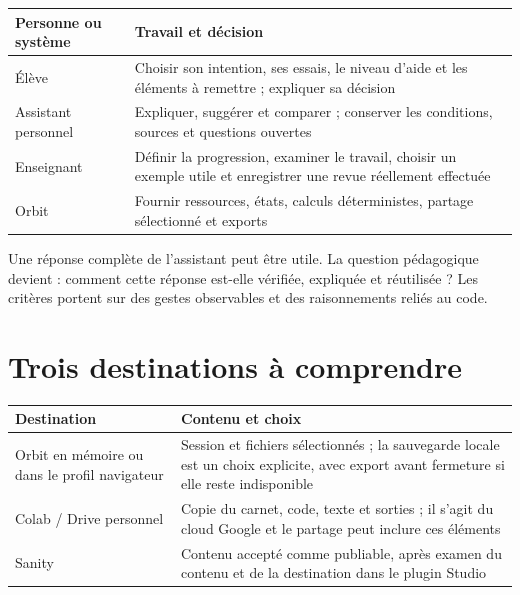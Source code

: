 \documentclass[
  canadien,
  11pt,
  a4paper,
]{report}
\newcounter{none} %
\begin{document}
{\def\LTcaptype{none} %
\begin{longtable}[]{@{}
  >{\raggedright\arraybackslash}p{}
  >{\raggedright\arraybackslash}p{}@{}}
\toprule\noalign{}
\begin{minipage}[b]{\linewidth}\raggedright
Personne ou système
\end{minipage} & \begin{minipage}[b]{\linewidth}\raggedright
Travail et décision
\end{minipage} \\
\midrule\noalign{}
\endhead
\bottomrule\noalign{}
\endlastfoot
Élève & Choisir son intention, ses essais, le niveau d'aide et les
éléments à remettre ; expliquer sa décision \\
Assistant personnel & Expliquer, suggérer et comparer ; conserver les
conditions, sources et questions ouvertes \\
Enseignant & Définir la progression, examiner le travail, choisir un
exemple utile et enregistrer une revue réellement effectuée \\
Orbit & Fournir ressources, états, calculs déterministes, partage
sélectionné et exports \\
\end{longtable}
}

Une réponse complète de l'assistant peut être utile. La question
pédagogique devient : comment cette réponse est-elle vérifiée, expliquée
et réutilisée ? Les critères portent sur des gestes observables et des
raisonnements reliés au code.

\section{Trois destinations à
comprendre}\label{trois-destinations-uxe0-comprendre}

{\def\LTcaptype{none} %
\begin{longtable}[]{@{}
  >{\raggedright\arraybackslash}p{}
  >{\raggedright\arraybackslash}p{}@{}}
\toprule\noalign{}
\begin{minipage}[b]{\linewidth}\raggedright
Destination
\end{minipage} & \begin{minipage}[b]{\linewidth}\raggedright
Contenu et choix
\end{minipage} \\
\midrule\noalign{}
\endhead
\bottomrule\noalign{}
\endlastfoot
Orbit en mémoire ou dans le profil navigateur & Session et fichiers
sélectionnés ; la sauvegarde locale est un choix explicite, avec export
avant fermeture si elle reste indisponible \\
Colab / Drive personnel & Copie du carnet, code, texte et sorties ; il
s'agit du cloud Google et le partage peut inclure ces éléments \\
Sanity & Contenu accepté comme publiable, après examen du contenu et de
la destination dans le plugin Studio \\
\end{longtable}
}
\end{document}
